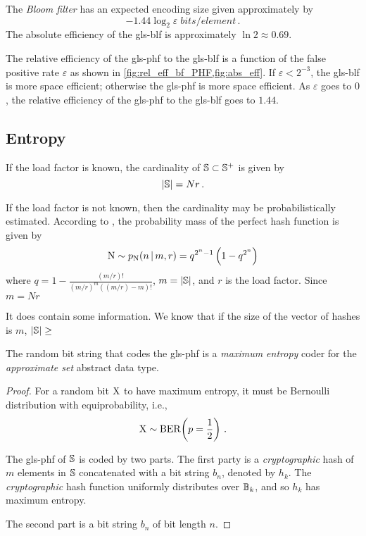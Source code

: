 \documentclass[ ../main.tex]{subfiles}
\begin{document}
The \emph{Bloom filter} has an expected encoding size given approximately by
\begin{equation}
    -1.44 \log_2 \varepsilon \; \si{bits \per element}\,.
\end{equation}
The absolute efficiency of the \gls{gls-blf} is approximately $\ln 2 \approx 0.69$.

The relative efficiency of the \gls{gls-phf} to the \gls{gls-blf} is a function of the false positive rate $\varepsilon$ as shown in \cref{fig:rel_eff_bf_PHF,fig:abs_eff}. If $\varepsilon < 2^{-3}$, the \gls{gls-blf} is more space efficient; otherwise the \gls{gls-phf} is more space efficient. As $\varepsilon$ goes to $0$, the relative efficiency of the \gls{gls-phf} to the \gls{gls-blf} goes to $1.44$. 

\subsection{Entropy}
If the load factor is known, the cardinality of $\mathbb{S} \subset \mathbb{S}^+$ is given by
\begin{equation}
    \left\vert{\mathbb{S}}\right\vert = N r\,.
\end{equation}

If the load factor is not known, then the cardinality may be probabilistically estimated.
According to \cite{}, the probability mass of the perfect hash function is given by
\begin{equation}
    \mathrm{N} \sim p_{\mathrm{N}}(n {\,|\,} m, r) = q^{2^n-1}\left(1 - q^{2^n}\right)
\end{equation}
where $q = 1 - \frac{(m/r)!}{(m/r)^m ((m/r)-m)!}$, $m = \left\vert{\mathbb{S}}\right\vert$, and $r$ is the load factor. Since $m = N r$

It does contain some information. We know that if the size of the vector of hashes is $m$, $\left\vert{\mathbb{S}}\right\vert \geq  $


\begin{theorem}
The random bit string that codes the \gls{gls-phf} is a \emph{maximum entropy} coder for the \emph{approximate set} abstract data type.
\end{theorem}
\begin{proof}
For a random bit $\mathrm{X}$ to have maximum entropy, it must be Bernoulli distribution with equiprobability, i.e.,
\begin{equation}
    \mathrm{X} \sim \operatorname{\rm{BER}}\!\left(p = \frac{1}{2}\right)\,.
\end{equation}

The \gls{gls-phf} of $\mathbb{S}$ is coded by two parts. The first party is a \emph{cryptographic} hash of $m$ elements in $\mathbb{S}$ concatenated with a bit string $b_n$, denoted by $h_k$. The \emph{cryptographic} hash function uniformly distributes over $\mathbb{B}_k$, and so $h_k$ has maximum entropy.

The second part is a bit string $b_n$ of bit length $n$.
\end{proof}
\end{document}
